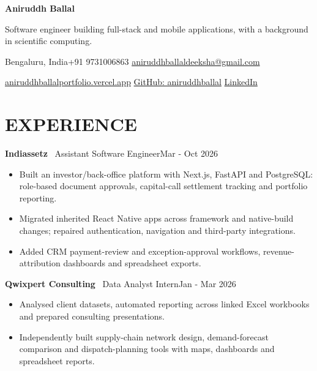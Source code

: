 \documentclass[a4paper,10pt]{article}
\newcommand{\job}[3]{%
  \textbf{#1} {\color{muted}\textbar\ #2}\hfill{\fontsize{9}{11}\selectfont\color{muted}#3}\par
}
\begin{document}
\fontsize{10}{12}\selectfont

{\fontsize{25}{29}\selectfont\bfseries\color{ink}Aniruddh Ballal}\par
\vspace{3pt}
{\fontsize{10.5}{13}\selectfont Software engineer building full-stack and mobile applications, with a background in scientific computing.}\par
\vspace{5pt}
{\fontsize{9}{11}\selectfont
Bengaluru, India\enspace\textbar\enspace +91 9731006863\enspace\textbar\enspace
\href{mailto:aniruddhballaldeeksha@gmail.com}{aniruddhballaldeeksha@gmail.com}\par
\vspace{2pt}
\href{https://aniruddhballalportfolio.vercel.app}{aniruddhballalportfolio.vercel.app}\enspace\textbar\enspace
\href{https://github.com/aniruddhballal}{GitHub: aniruddhballal}\enspace\textbar\enspace
\href{https://linkedin.com/in/aniruddhballal}{LinkedIn}
}\par

\section{EXPERIENCE}

\job{Indiassetz}{Assistant Software Engineer}{Mar - Oct 2026}
\begin{itemize}
  \item Built an investor/back-office platform with Next.js, FastAPI and PostgreSQL: role-based document approvals, capital-call settlement tracking and portfolio reporting.
  \item Migrated inherited React Native apps across framework and native-build changes; repaired authentication, navigation and third-party integrations.
  \item Added CRM payment-review and exception-approval workflows, revenue-attribution dashboards and spreadsheet exports.
\end{itemize}
\vspace{3pt}

\job{Qwixpert Consulting}{Data Analyst Intern}{Jan - Mar 2026}
\begin{itemize}
  \item Analysed client datasets, automated reporting across linked Excel workbooks and prepared consulting presentations.
  \item Independently built supply-chain network design, demand-forecast comparison and dispatch-planning tools with maps, dashboards and spreadsheet reports.
\end{itemize}
\vspace{3pt}
\end{document}
